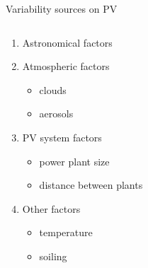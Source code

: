 \documentclass{beamer}%
\begin{document}
\begin{frame}[plain]{Variability sources on PV}
  \begin{columns}
    \begin{column}{0.5\textwidth}
  \begin{enumerate}
  \item Astronomical factors  
  \item <2->Atmospheric factors
    \begin{itemize}
    \item clouds
    \item aerosols
    \end{itemize}    
  \item <3->PV system factors
    \begin{itemize}
    \item  power plant size
    \item distance between plants
    \end{itemize}
    \item <4->Other factors
      \begin{itemize}
      \item temperature
      \item soiling
      \end{itemize}
  \end{enumerate}
\end{column}
\begin{column}{0.65\textwidth}    
       \begin{figure}
       \begin{figure}
      \end{figure}

\end{figure}
\end{column}
\end{columns}
\end{frame}
\end{document}
